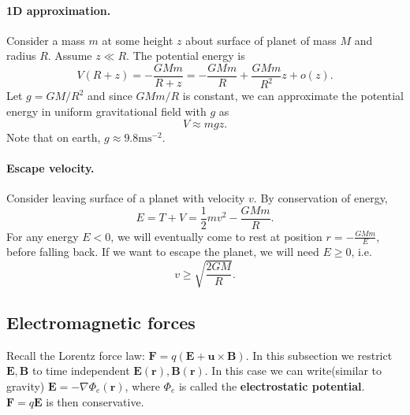 \paragraph{1D approximation.} Consider a mass $m$ at some height $z$ about surface of planet of mass $M$ and radius $R$. Assume $z\ll R $. The potential energy is 
\[
    V(R+z) = -\frac{GMm}{R+z} = -\frac{GMm}{R}+\frac{GMm}{R^2}z+o(z).
\]
Let $ g = GM/R^2 $ and since $ GMm/R $ is constant, we can approximate the potential energy in uniform gravitational field with $g$ as 
\[
    V\approx mgz.
\]
Note that on earth, $ g\approx 9.8\mathrm{m}\mathrm{s}^{-2} $.

\paragraph{Escape velocity.} Consider leaving surface of a planet with velocity $v$. By conservation of energy,
\[
    E = T+V = \frac{1}{2}mv^2-\frac{GMm}{R}.
\]
For any energy $E < 0$, we will eventually come to rest at position $r = -\frac{GMm}{E}$, before falling back. If we want to escape the planet, we will need $ E\ge 0 $, i.e. 
\[
    v\ge \sqrt{\frac{2GM}{R}}.
\]
\begin{center}
\end{center}

\subsection{Electromagnetic forces}
Recall the Lorentz force law: $ \mathbf{F} = q(\mathbf{E}+\mathbf{u} \times \mathbf{B}) $. In this subsection we restrict $\mathbf{E},\mathbf{B}$ to time independent $ \mathbf{E}(\mathbf{r}),\mathbf{B}(\mathbf{r}) $. In this case we can write(similar to gravity) $ \mathbf{E} = - \nabla \Phi_e(\mathbf{r}) $, where $ \Phi_e $ is called the \textbf{electrostatic potential}. $\mathbf{F}=q\mathbf{E}$ is then conservative.

